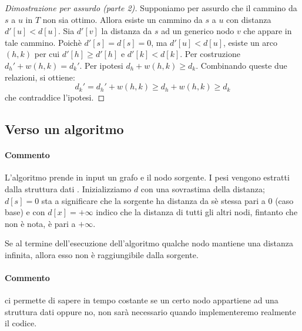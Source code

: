 \begin{proof}[Dimostrazione per assurdo (parte 2)]
Supponiamo per assurdo che il cammino da \(s\) a \(u\) in \(T\) non sia ottimo.
Allora esiste un cammino da \(s\) a \(u\) con distanza \(d'[u]<d[u]\).
Sia \(d'[v]\) la distanza da \(s\) ad un generico nodo \(v\) che appare in tale cammino.
Poichè \(d'[s] = d[s] = 0\), ma \(d'[u]<d[u]\), esiste un arco \((h,k)\) per cui \(d'[h] \geqslant d'[h]\) e \(d'[k]< d[k]\).
Per costruzione \(d_h' + w(h,k) = d_k'\).
Per ipotesi \(d_h + w(h,k) \ge d_k\).
Combinando queste due relazioni, si ottiene:
\begin{equation*}
d_k' = d_h' + w(h,k) \geqslant d_h + w(h,k) \geqslant d_k
\end{equation*}
che contraddice l'ipotesi.
\end{proof}

\subsection{Verso un algoritmo}

\begin{algorithm}[H]
	\caption{Algoritmo prototipo per il calcolo dei cammini minimi}
	
\end{algorithm}

\paragraph{Commento}
L'algoritmo prende in input un grafo e il nodo sorgente.
I pesi vengono estratti dalla struttura dati \Graph.
Inizializziamo \(d\) con una sovrastima della distanza; \(d[s] = 0\) sta a significare che la sorgente ha distanza da sè stessa pari a 0 (caso base) e con \(d[x] = +\infty\) indico che la distanza di tutti gli altri nodi, fintanto che non è nota, è pari a \(+\infty\).

\begin{note}
Se al termine dell'esecuzione dell'algoritmo qualche nodo mantiene una distanza infinita, allora esso non è raggiungibile dalla sorgente.
\end{note}

\begin{algorithm}[H]
	\caption{Algoritmo generico per il calcolo dei cammini minimi}
	
\end{algorithm}

\paragraph{Commento}
\Array{\Bool} ci permette di sapere in tempo costante se un certo nodo appartiene ad una struttura dati oppure no, non sarà necessario quando implementeremo realmente il codice.

